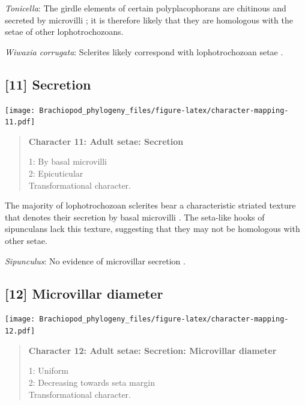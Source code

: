 \documentclass[openany]{book}
\begin{document}
\hypertarget{Tonicella-coding-10}{}
\emph{Tonicella}: The girdle elements of certain polyplacophorans are
chitinous and secreted by microvilli
\citep{Fischer1980, Leise1982, Leise1988}; it is therefore likely that
they are homologous with the setae of other lophotrochozoans.

\hypertarget{Wiwaxia_corrugata-coding-10}{}
\emph{Wiwaxia corrugata}: Sclerites likely correspond with
lophotrochozoan setae \citep{Butterfield1990, Smith2014, Zhang2015}.

\subsection*{{[}11{]} Secretion}\label{secretion}

\texttt{[image: Brachiopod\_phylogeny\_files/figure-latex/character-mapping-11.pdf]}

\begin{quote}
\textbf{Character 11: Adult setae: Secretion}

1: By basal microvilli\\
2: Epicuticular\\
Transformational character.
\end{quote}

The majority of lophotrochozoan sclerites bear a characteristic striated
texture that denotes their secretion by basal microvilli
\citep{Butterfield1990}. The seta-like hooks of sipunculans lack this
texture, suggesting that they may not be homologous with other setae.

\hypertarget{Sipunculus-coding-11}{}
\emph{Sipunculus}: No evidence of microvillar secretion
\citep[e.g.][]{Schulze2005}.

\subsection*{{[}12{]} Microvillar diameter}\label{microvillar-diameter}

\texttt{[image: Brachiopod\_phylogeny\_files/figure-latex/character-mapping-12.pdf]}

\begin{quote}
\textbf{Character 12: Adult setae: Secretion: Microvillar diameter}

1: Uniform\\
2: Decreasing towards seta margin\\
Transformational character.
\end{quote}
\end{document}
